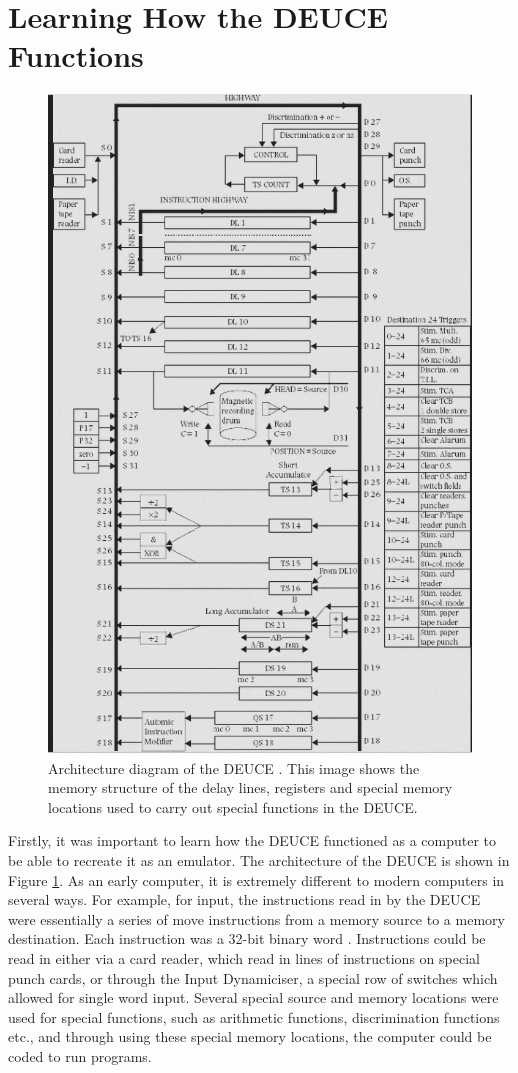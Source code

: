 \documentclass{l4proj}
\begin{document}
\section{Learning How the DEUCE Functions}
\begin{figure}[h!]
	\centering
	\includegraphics[width=0.5\linewidth]{images/deuce-arch.jpg} 
	\caption{Architecture diagram of the DEUCE \citep{Vowels05}. This image shows the memory structure of the delay lines, registers and special memory locations used to carry out special functions in the DEUCE.}
	\label{fig:arch}
\end{figure}

Firstly, it was important to learn how the DEUCE functioned as a computer to be able to recreate it as an emulator. The architecture of the DEUCE is shown in Figure \ref{fig:arch}. As an early computer, it is extremely different to modern computers in several ways. For example, for input, the instructions read in by the DEUCE were essentially a series of move instructions from a memory source to a memory destination. Each instruction was a 32-bit binary word \citep{Weth10}. Instructions could be read in either via a card reader, which read in lines of instructions on special punch cards, or through the Input Dynamiciser, a special row of switches which allowed for single word input. Several special source and memory locations were used for special functions, such as arithmetic functions, discrimination functions etc., and through using these special memory locations, the computer could be coded to run programs.
\end{document}
